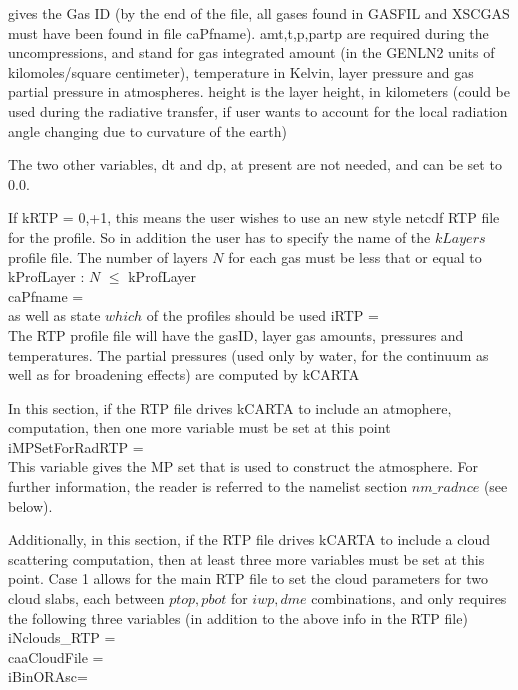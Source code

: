 \documentclass[12pt]{article}
\newcommand{\kc}{\textsf{kCARTA}\xspace}
\newcommand{\ttab}{\indent\indent}
\begin{document}
{\medskip
{} gives the Gas ID (by the end of the file, all
gases found in GASFIL and XSCGAS must have been found in file
caPfname).  {\sf amt,t,p,partp} are required during the
uncompressions, and stand for gas integrated amount (in the {\sf
GENLN2} units of kilomoles/square centimeter), temperature in
Kelvin, layer pressure and gas partial pressure in atmospheres.
{\sf height} is the layer height, in kilometers (could be used
during the radiative transfer, if user wants to account for the
local radiation angle changing due to curvature of the earth)

The two other variables, {\sf dt} and {\sf dp}, at present are not
needed, and can be set to 0.0.

If kRTP = 0,+1, this means the user wishes to use an new style netcdf RTP
file for the profile. So in addition the user has to specify the name 
of the $kLayers$ profile file. The number of layers $N$ for each gas must
be less that or equal to kProfLayer : $N$ $\le$ kProfLayer\\
{\sf 
\ttab caPfname = \\
}
as well as state $which$ of the profiles should be used
{\sf 
\ttab iRTP = \\
}
The RTP profile file will have the gasID, layer gas amounts, pressures and
temperatures. The partial pressures (used only by water, for the continuum as
well as for broadening effects) are computed by \kc

In this section, if the RTP file drives \kc to include an atmophere, 
computation, then one more variable must be set at this point \\
{\sf 
\ttab iMPSetForRadRTP = \\
}
This variable gives the MP set that is used to construct the atmosphere. For 
further information, the reader is referred to the namelist section 
$nm\_radnce$  (see below).

Additionally, in this section, if the RTP file drives \kc to include a cloud 
scattering computation, then at least three more variables must be set at this
point. Case 1 allows for the main RTP file to set the cloud parameters for two
cloud slabs, each between $ptop,pbot$ for $iwp,dme$ combinations, and only
requires the following three variables (in addition to the above info in the
RTP file) \\
{\sf 
\ttab iNclouds\_RTP = \\
\ttab caaCloudFile = \\
\ttab iBinORAsc= \\
}

}
\end{document}
